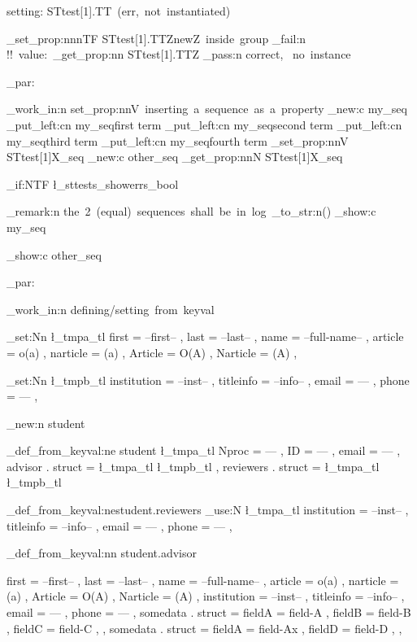 \documentclass{article}
\begin{document}
setting: STtest[1].TT~(err,~not~instantiated)\par
  \starray_set_prop:nnnTF {STtest[1].TT}{Z}{newZ~inside~group}
    {\sttests_fail:n {!!~value:~\starray_get_prop:nn {STtest[1].TT}{Z}}}
    {\sttests_pass:n {correct, ~no~instance}}


\sttests_par:

\sttests_work_in:n {set_prop:nnV~inserting~a~sequence~as~a~property}
        \seq_new:c {my_seq}
        \seq_put_left:cn {my_seq}{first term}
        \seq_put_left:cn {my_seq}{second term}
        \seq_put_left:cn {my_seq}{third term}
        \seq_put_left:cn {my_seq}{fourth term}
        \starray_set_prop:nnV {STtest[1]}{X}{\my_seq}
        \seq_new:c {other_seq}
        \starray_get_prop:nnN {STtest[1]}{X}\other_seq

\bool_if:NTF \l_sttests_showerrs_bool
  {
    \sttests_remark:n {the~2~(equal)~sequences~shall~be~in~log~\tl_to_str:n{(\show)}}
   \seq_show:c {my_seq}

   \seq_show:c {other_seq}
  }
  {
  }


\sttests_par:

\sttests_work_in:n {defining/setting~from~keyval}

        \tl_set:Nn \l_tmpa_tl {
          first = --first-- ,
          last = --last-- ,
          name = --full-name-- ,
          article = o(a) ,
          narticle = (a) ,
          Article = O(A) ,
          Narticle = (A) ,
        }

        \tl_set:Nn \l_tmpb_tl {
          institution = --inst-- ,
          titleinfo = --info-- ,
          email = --- ,
          phone = --- ,
        }

        \starray_new:n {student}

        \starray_def_from_keyval:ne {student}
        {
          \l_tmpa_tl
          Nproc = --- ,
          ID = --- ,
          email = --- ,
          advisor . struct = {
            \l_tmpa_tl
            \l_tmpb_tl
          } ,
          reviewers . struct = {
            \l_tmpa_tl
            \l_tmpb_tl
          }
        }

        \starray_def_from_keyval:ne{student.reviewers}
        {
          \tl_use:N \l_tmpa_tl
          institution = --inst-- ,
          titleinfo = --info-- ,
          email = --- ,
          phone = --- ,
        }

        \starray_def_from_keyval:nn {student.advisor}
        {
          first = --first-- ,
          last = --last-- ,
          name = --full-name-- ,
          article = o(a) ,
          narticle = (a) ,
          Article = O(A) ,
          Narticle = (A) ,
          institution = --inst-- ,
          titleinfo = --info-- ,
          email = --- ,
          phone = --- ,
          somedata . struct = {
            fieldA = field-A ,
            fieldB = field-B ,
            fieldC = field-C ,
          } ,
          somedata . struct = {
            fieldA = field-Ax ,
            fieldD = field-D ,
          } ,
          
        }
\end{document}
